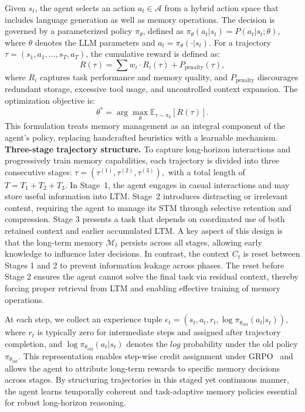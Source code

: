 Given $s_t$, the agent selects an action $a_t \in \mathcal{A}$ from a hybrid action space that includes language generation as well as memory operations. The decision is governed by a parameterized policy $\pi_\theta$, defined as 
$\pi_\theta(a_t | s_t) = P(a_t | s_t; \theta)$,
where $\theta$ denotes the LLM parameters and $a_t = \pi_\theta(\cdot|s_t)$.
For a trajectory $\tau = (s_1, a_1, \ldots, s_T, a_T)$, the cumulative reward is defined as:
\begin{equation}
R(\tau) = \sum w_i \cdot R_i\left(\tau\right) + P_{\text{penalty}}(\tau),
\end{equation}
where $R_i$ captures task performance and memory quality, and $P_{\text{penalty}}$ discourages redundant storage, excessive tool usage, and uncontrolled context expansion. The optimization objective is:
\begin{equation}
\theta^{*} = \arg\max_{\theta} \mathbb{E}_{\tau \sim \pi_\theta} [ R(\tau) ].
\end{equation}
This formulation treats memory management as an integral component of the agent’s policy, replacing handcrafted heuristics with a learnable mechanism.
\\
\textbf{Three-stage trajectory structure.} To capture long-horizon interactions and progressively train memory capabilities, each trajectory is divided into three consecutive stages: $\tau = (\tau^{(1)}, \tau^{(2)}, \tau^{(3)}),$
with a total length of $T = T_1 + T_2 + T_3$. In Stage~1, the agent engages in casual interactions and may store useful information into LTM. Stage~2 introduces distracting or irrelevant content, requiring the agent to manage its STM through selective retention and compression. Stage 3 presents a task that depends on coordinated use of both retained context and earlier accumulated LTM. A key aspect of this design is that the long-term memory $\mathcal{M}_t$ persists across all stages, allowing early knowledge to influence later decisions. In contrast, the context $C_t$ is reset between Stages 1 and 2 to prevent information leakage across phases. The reset before Stage 2 ensures the agent cannot solve the final task via residual context, thereby forcing proper retrieval from LTM and enabling effective training of memory operations.

At each step, we collect an experience tuple $e_t = (s_t, a_t, r_t, \log \pi_{\theta_{\text{old}}}(a_t | s_t))$,
where $r_t$ is typically zero for intermediate steps and assigned after trajectory completion, and $\log \pi_{\theta_{\text{old}}}(a_t | s_t)$ denotes the $log$ probability under the old policy $\pi_{\theta_{\text{old}}}$. This representation enables step-wise credit assignment under GRPO~\citep{shao2024deepseekmath} and allows the agent to attribute long-term rewards to specific memory decisions across stages. By structuring trajectories in this staged yet continuous manner, the agent learns temporally coherent and task-adaptive memory policies essential for robust long-horizon reasoning.



